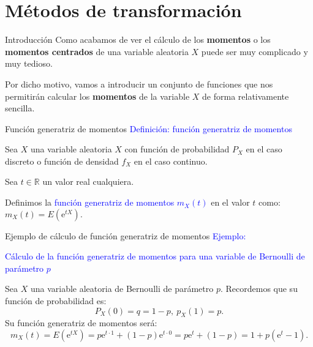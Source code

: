 \documentclass[
  ignorenonframetext,
  aspectratio=169]{beamer}
\newcommand\blue[1]{\textcolor{blue}{#1}}
\begin{document}
\hypertarget{muxe9todos-de-transformaciuxf3n}{%
\section{Métodos de
transformación}\label{muxe9todos-de-transformaciuxf3n}}

\begin{frame}{Introducción}
\protect\hypertarget{introducciuxf3n}{}
Como acabamos de ver el cálculo de los \textbf{momentos} o los
\textbf{momentos centrados} de una variable aleatoria \(X\) puede ser
muy complicado y muy tedioso.

Por dicho motivo, vamos a introducir un conjunto de funciones que nos
permitirán calcular los \textbf{momentos} de la variable \(X\) de forma
relativamente sencilla.
\end{frame}

\begin{frame}{Función generatriz de momentos}
\protect\hypertarget{funciuxf3n-generatriz-de-momentos}{}
\blue{Definición: función generatriz de momentos}

Sea \(X\) una variable aleatoria \(X\) con función de probabilidad
\(P_X\) en el caso discreto o función de densidad \(f_X\) en el caso
continuo.

Sea \(t\in\mathbb{R}\) un valor real cualquiera.

Definimos la \blue{función generatriz de momentos $m_X(t)$} en el valor
\(t\) como: \(m_X(t)=E\left(\mathrm{e}^{tX}\right).\)
\end{frame}

\begin{frame}{Ejemplo de cálculo de función generatriz de momentos}
\protect\hypertarget{ejemplo-de-cuxe1lculo-de-funciuxf3n-generatriz-de-momentos}{}
\blue{Ejemplo:}

\blue{Cálculo de la función generatriz de momentos para una variable de Bernoulli de parámetro $p$}

Sea \(X\) una variable aleatoria de Bernoulli de parámetro \(p\).
Recordemos que su función de probabilidad es: \[
P_X(0)=q=1-p,\ p_X(1)=p.
\] Su función generatriz de momentos será: \[
m_X (t)=E\left(\mathrm{e}^{tX}\right) =p\mathrm{e}^{t\cdot 1}+(1-p)\mathrm{e}^{t\cdot 0}=p\mathrm{e}^t+(1-p)=1+p\left(\mathrm{e}^t -1 \right).
\]
\end{frame}
\end{document}
